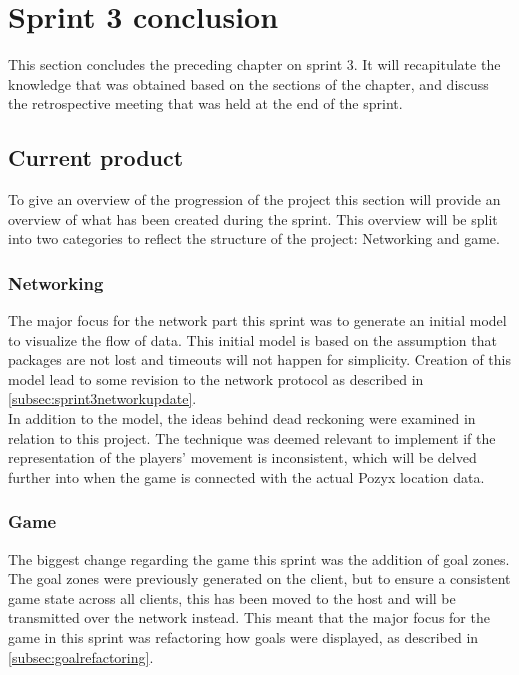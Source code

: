 \section{Sprint 3 conclusion}\label{sec:sprint3conclusion}
This section concludes the preceding chapter on sprint 3.
It will recapitulate the knowledge that was obtained based on the sections of the chapter, and discuss the retrospective meeting that was held at the end of the sprint.

\subsection{Current product}
To give an overview of the progression of the project this section will provide an overview of what has been created during the sprint.
This overview will be split into two categories to reflect the structure of the project: Networking and game.

\subsubsection{Networking}
The major focus for the network part this sprint was to generate an initial \uppaal model to visualize the flow of data.
This initial model is based on the assumption that packages are not lost and timeouts will not happen for simplicity.
Creation of this model lead to some revision to the network protocol as described in \autoref{subsec:sprint3networkupdate}.\\
In addition to the \uppaal model, the ideas behind dead reckoning were examined in relation to this project.
The technique was deemed relevant to implement if the representation of the players' movement is inconsistent, which will be delved further into when the game is connected with the actual Pozyx location data.

\subsubsection{Game}
The biggest change regarding the game this sprint was the addition of goal zones.
The goal zones were previously generated on the client, but to ensure a consistent game state across all clients, this has been moved to the host and will be transmitted over the network instead.
This meant that the major focus for the game in this sprint was refactoring how goals were displayed, as described in \autoref{subsec:goalrefactoring}.

